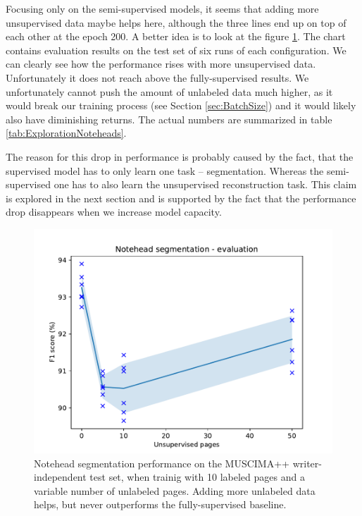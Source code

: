 Focusing only on the semi-supervised models, it seems that adding more unsupervised data maybe helps here, although the three lines end up on top of each other at the epoch 200. A better idea is to look at the figure \ref{fig:ExplorationNoteheadsEvaluation}. The chart contains evaluation results on the test set of six runs of each configuration. We can clearly see how the performance rises with more unsupervised data. Unfortunately it does not reach above the fully-supervised results. We unfortunately cannot push the amount of unlabeled data much higher, as it would break our training process (see Section \ref{sec:BatchSize}) and it would likely also have diminishing returns. The actual numbers are summarized in table \ref{tab:ExplorationNoteheads}.

The reason for this drop in performance is probably caused by the fact, that the supervised model has to only learn one task -- segmentation. Whereas the semi-supervised one has to also learn the unsupervised reconstruction task. This claim is explored in the next section and is supported by the fact that the performance drop disappears when we increase model capacity.

\begin{figure}[ht]
    \centering
    \includegraphics[width=140mm]{../../figures/01-exploration-noteheads/noteheads-evaluation.pdf}
    \caption{Notehead segmentation performance on the MUSCIMA++ writer-independent test set, when trainig with 10 labeled pages and a variable number of unlabeled pages. Adding more unlabeled data helps, but never outperforms the fully-supervised baseline.}
    \label{fig:ExplorationNoteheadsEvaluation}
\end{figure}


